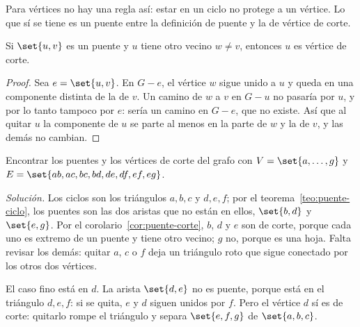 \documentclass[11pt,letterpaper]{article}
\begin{document}
Para vértices no hay una regla así: estar en un ciclo no protege a un
vértice. Lo que sí se tiene es un puente entre la definición de puente
y la de vértice de corte.

\begin{corolario}
  \label{cor:puente-corte}
  Si $\set{u, v}$ es un puente y $u$ tiene otro vecino $w \neq v$,
  entonces $u$ es vértice de corte.
\end{corolario}

\begin{proof}
  Sea $e = \set{u, v}$. En $G - e$, el vértice $w$ sigue unido a $u$ y
  queda en una componente distinta de la de $v$. Un camino de $w$ a
  $v$ en $G - u$ no pasaría por $u$, y por lo tanto tampoco por $e$:
  sería un camino en $G - e$, que no existe.
  Así que al quitar $u$ la componente de $u$ se parte al menos en la
  parte de $w$ y la de $v$, y las demás no cambian.
\end{proof}

\begin{ejercicio}
  \label{ej:puentes-teoria}
  Encontrar los puentes y los vértices de corte del grafo con
  $V = \set{a, \dots, g}$ y
  $E = \set{ab, ac, bc, bd, de, df, ef, eg}$.

  \textit{Solución.} Los ciclos son los triángulos $a, b, c$ y
  $d, e, f$; por el teorema~\ref{teo:puente-ciclo}, los puentes son las
  dos aristas que no están en ellos, $\set{b,d}$ y $\set{e,g}$. Por el
  corolario~\ref{cor:puente-corte}, $b$, $d$ y $e$ son de corte, porque
  cada uno es extremo de un puente y tiene otro vecino; $g$ no, porque
  es una hoja. Falta revisar los demás: quitar $a$, $c$ o $f$ deja un
  triángulo roto que sigue conectado por los otros dos vértices.
  \begin{center}
  \end{center}
  El caso fino está en $d$. La arista $\set{d, e}$ no es puente,
  porque está en el triángulo $d, e, f$: si se quita, $e$ y $d$ siguen
  unidos por $f$. Pero el vértice $d$ sí es de corte: quitarlo rompe
  el triángulo y separa $\set{e, f, g}$ de $\set{a, b, c}$.
\end{ejercicio}
\end{document}
